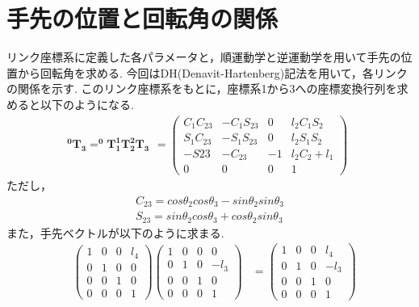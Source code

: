   \section{手先の位置と回転角の関係}
  	\label{chap:kinetic}
	リンク座標系に定義した各パラメータと，順運動学と逆運動学を用いて手先の位置から回転角を求める. 今回はDH(Denavit-Hartenberg)記法を用いて，各リンクの関係を示す.
	このリンク座標系をもとに，座標系1から3への座標変換行列を求めると以下のようになる.
	\begin{equation}
		\boldsymbol{ ^{0}T_{3}=^{0}T_{1} ^{1}T_{2} ^{2}T_{3} }
		\begin{array}{cc}
			=
			\left(
				\begin{array}{cccc}
					C_1C_{23} & -C_1S_{23} & 0 & l_2C_1S_2 \\
					S_1C_{23} & -S_1S_{23} & 0 & l_2S_1S_2 \\
					-S{23} & -C_{23} & -1 & l_2C_2 + l_1 \\
					0 & 0 & 0 & 1
				\end{array}
			\right)
		\end{array}
	\end{equation}
	ただし，
	\begin{equation*}
		\begin{split}
			C_{23} = cos\theta_2cos\theta_3-sin\theta_2sin\theta_3\\
			S_{23} = sin\theta_2cos\theta_3+cos\theta_2sin\theta_3
		\end{split}
	\end{equation*}
    また，手先ベクトルが以下のように求まる.
	\begin{equation}
	\begin{array}{cccc}
		&\left(
			\begin{array}{cccc}
				1 & 0 & 0 & l_4\\
				0 & 1 & 0 & 0\\
				0 & 0 & 1 & 0\\
				0 & 0 & 0 & 1
			\end{array}
		\right)
		\left(
			\begin{array}{cccc}
				1 & 0 & 0 & 0\\
				0 & 1 & 0 & -l_3\\
				0 & 0 & 1 & 0\\
				0 & 0 & 0 & 1
			\end{array}
			\right)
		&=
		\left(
		\begin{array}{cccc}
			1 & 0 & 0 & l_4\\
			0 & 1 & 0 & -l_3\\
			0 & 0 & 1 & 0\\
			0 & 0 & 0 & 1
		\end{array}
		\right)
	\end{array}
	\end{equation}
